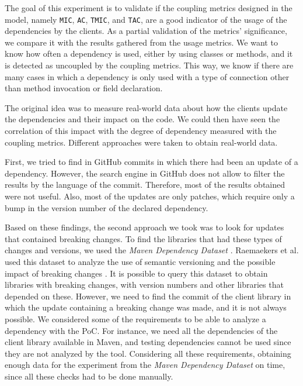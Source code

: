 The goal of this experiment is to validate if the coupling metrics designed in the model, namely \texttt{MIC}, \texttt{AC}, \texttt{TMIC}, and \texttt{TAC}, are a good indicator of the usage of the dependencies by the clients. As a partial validation of the metrics' significance, we compare it with the results gathered from the usage metrics. We want to know how often a dependency is used, either by using classes or methods, and it is detected as uncoupled by the coupling metrics. This way, we know if there are many cases in which a dependency is only used with a type of connection other than method invocation or field declaration.


The original idea was to measure real-world data about how the clients update the dependencies and their impact on the code. We could then have seen the correlation of this impact with the degree of dependency measured with the coupling metrics. Different approaches were taken to obtain real-world data.

First, we tried to find in GitHub commits in which there had been an update of a dependency. However, the search engine in GitHub does not allow to filter the results by the language of the commit. Therefore, most of the results obtained were not useful. Also, most of the updates are only patches, which require only a bump in the version number of the declared dependency.

Based on these findings, the second approach we took was to look for updates that contained breaking changes. To find the libraries that had these types of changes and versions, we used the \textit{Maven Dependency Dataset} \cite{Raemaekers2013}. Raemaekers et al. used this dataset to analyze the use of semantic versioning and the possible impact of breaking changes \cite{Raemaekers2017}. It is possible to query this dataset to obtain libraries with breaking changes, with version numbers and other libraries that depended on these. However, we need to find the commit of the client library in which the update containing a breaking change was made, and it is not always possible. We considered some of the requirements to be able to analyze a dependency with the PoC. For instance, we need all the dependencies of the client library available in Maven, and testing dependencies cannot be used since they are not analyzed by the tool. Considering all these requirements, obtaining enough data for the experiment from the \textit{Maven Dependency Dataset} on time, since all these checks had to be done manually.

